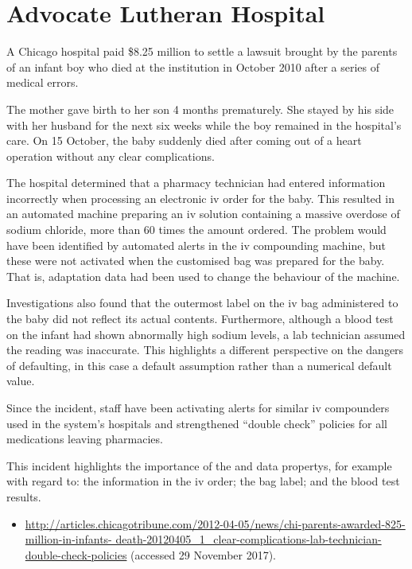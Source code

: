\section{Advocate Lutheran Hospital} \label{bkm:incacc:advocatelutheran}
A Chicago hospital paid \$8.25 million to settle a lawsuit brought by the parents of an infant boy who died at the institution in October 2010 after a series of medical errors.

The mother gave birth to her son 4 months prematurely. She stayed by his side with her husband for the next six weeks while the boy remained in the hospital's care. On 15 October, the baby suddenly died after coming out of a heart operation without any clear complications.

The hospital determined that a pharmacy technician had entered \gls{information} incorrectly when processing an electronic \gls{iv} order for the baby. This resulted in an automated machine preparing an \gls{iv} solution containing a massive overdose of sodium chloride, more than 60 times the amount ordered. The problem would have been identified by automated alerts in the \gls{iv} compounding machine, but these were not activated when the customised bag was prepared for the baby. That is, \gls{adaptation data} had been used to change the behaviour of the machine.

Investigations also found that the outermost label on the \gls{iv} bag administered to the baby did not reflect its actual contents. Furthermore, although a blood test on the infant had shown abnormally high sodium levels, a lab technician assumed the reading was inaccurate. This highlights a different perspective on the dangers of defaulting, in this case a default assumption rather than a numerical default value.

Since the incident, staff have been activating alerts for similar \gls{iv} compounders used in the system's hospitals and strengthened ``double check'' policies for all medications leaving pharmacies.

This incident highlights the importance of the  and  \glspl{data property}, for example with regard to: the \gls{information} in the \gls{iv} order; the bag label; and the blood test results.

\begin{samepage}
\begin{itemize}
  \item \raggedright{\href{http://articles.chicagotribune.com/2012-04-05/news/chi-parents-awarded-825-million-in-infants-death-20120405_1_clear-complications-lab-technician-double-check-policies}{http://articles.chicagotribune.com/2012-04-05/news/chi-parents-awarded-825-million-in-infants- death-20120405\_1\_clear-complications-lab-technician-double-check-policies} (accessed 29 November 2017).}
\end{itemize}
\end{samepage}


